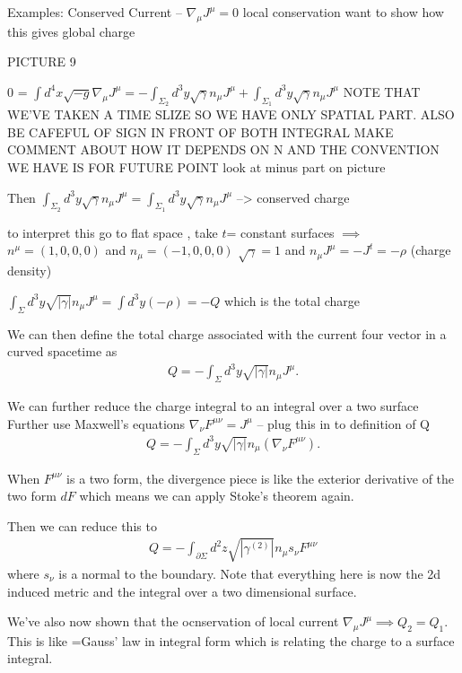 \documentclass[10pt]{article}
\begin{document}
Examples: Conserved Current -- $\nabla_\mu J^\mu = 0$ local conservation want to show how this gives global charge 

PICTURE 9

0 = $\int d^4 x \sqrt{-g} \nabla_\mu J^\mu = -\int_{\Sigma_2} d^3 y \sqrt{\gamma} n_\mu J^\mu +\int_{\Sigma_1} d^3 y \sqrt{\gamma} n_\mu J^\mu$ NOTE THAT WE'VE TAKEN A TIME SLIZE SO WE HAVE ONLY SPATIAL PART. ALSO BE CAFEFUL OF SIGN IN FRONT OF BOTH INTEGRAL MAKE COMMENT ABOUT HOW IT DEPENDS ON N AND THE CONVENTION WE HAVE IS FOR FUTURE POINT  look at minus part on picture 


Then $\int_{\Sigma_2} d^3 y \sqrt{\gamma} n_\mu J^\mu=\int_{\Sigma_1} d^3 y \sqrt{\gamma} n_\mu J^\mu$ --> conserved charge

to interpret this go to flat space , take $t$= constant surfaces $\implies$ $n^\mu = (1,0,0,0)$ and $n_\mu = (-1,0,0,0)$ $\sqrt{\gamma} = 1$ and $n_\mu J^\mu = -J^t = -\rho$ (charge density)

$\int_\Sigma d^3 y \sqrt{|\gamma|} n_\mu J^\mu = \int d^3 y (-\rho) = -Q$ which is the total charge 

We can then define the total charge associated with the current four vector in a curved spacetime  as 
\begin{align}
Q = -\int_\Sigma d^3 y \sqrt{|\gamma|} n_\mu J^\mu. 
\end{align}

We can further reduce the charge integral to an integral over a two surface 
Further use Maxwell's equations 
$\nabla_\nu F^{\mu \nu} = J^\mu$ -- plug this in to definition of Q
\begin{align}
Q = -\int_\Sigma d^3 y \sqrt{|\gamma|} n_\mu (\nabla_\nu F^{\mu \nu}).  
\end{align}

When $F^{\mu \nu}$ is a two form, the divergence piece is like the exterior derivative of the two form $dF$ which means we can apply Stoke's theorem again. 

Then we can reduce this to 
\begin{align}
Q = -\int_{\partial \Sigma} d^2 z \sqrt{|\gamma^{(2)}|} n_\mu s_\nu F^{\mu \nu}
\end{align}
where $s_\nu$ is a normal to the boundary. Note that everything here is now the 2d induced metric and the integral over a two dimensional surface. 

We've also now shown that the ocnservation of local current $\nabla_\mu J^\mu \implies Q_2 = Q_1$. This is like =Gauss' law in integral form which is relating the charge to a surface integral. 
\end{document}
